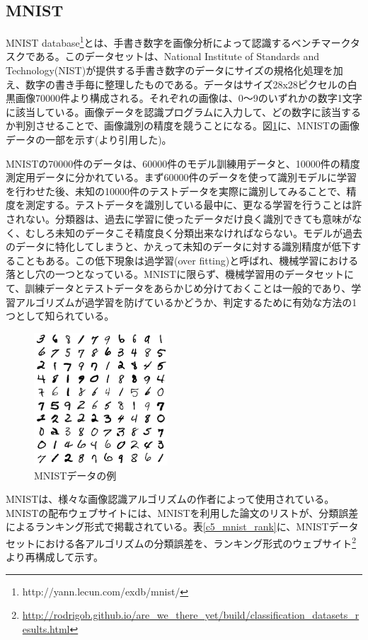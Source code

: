\subsection{MNIST}
MNIST database\footnote{http://yann.lecun.com/exdb/mnist/}とは、手書き数字を画像分析によって認識するベンチマークタスクである。このデータセットは、National Institute of Standards and Technology(NIST)が提供する手書き数字のデータにサイズの規格化処理を加え、数字の書き手毎に整理したものである。データはサイズ28x28ピクセルの白黒画像70000件より構成される\cite{lecun1998gradient-based}。それぞれの画像は、0〜9のいずれかの数字1文字に該当している。画像データを認識プログラムに入力して、どの数字に該当するか判別させることで、画像識別の精度を競うことになる。図\ref{c5_mnist_ex}に、MNISTの画像データの一部を示す(\cite{lecun1998gradient-based}より引用した)。\par
MNISTの70000件のデータは、60000件のモデル訓練用データと、10000件の精度測定用データに分かれている。まず60000件のデータを使って識別モデルに学習を行わせた後、未知の10000件のテストデータを実際に識別してみることで、精度を測定する。テストデータを識別している最中に、更なる学習を行うことは許されない。分類器は、過去に学習に使ったデータだけ良く識別できても意味がなく、むしろ未知のデータこそ精度良く分類出来なければならない。モデルが過去のデータに特化してしまうと、かえって未知のデータに対する識別精度が低下することもある。この低下現象は過学習(over fitting)と呼ばれ、機械学習における落とし穴の一つとなっている。MNISTに限らず、機械学習用のデータセットにて、訓練データとテストデータをあらかじめ分けておくことは一般的であり、学習アルゴリズムが過学習を防げているかどうか、判定するために有効な方法の1つとして知られている。\par
\begin{figure}[tbp]
 \begin{center}
  \includegraphics[width=50mm]{img/c5/mnist_ex}
 \end{center}
 \caption{MNISTデータの例}
 \label{c5_mnist_ex}
\end{figure}
MNISTは、様々な画像認識アルゴリズムの作者によって使用されている。MNISTの配布ウェブサイトには、MNISTを利用した論文のリストが、分類誤差によるランキング形式で掲載されている。表\ref{c5_mnist_rank}に、MNISTデータセットにおける各アルゴリズムの分類誤差を、ランキング形式のウェブサイト\footnote{\label{c5_rank}\url{http://rodrigob.github.io/are_we_there_yet/build/classification_datasets_results.html}}より再構成して示す。

